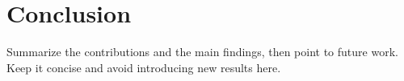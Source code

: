 \section{Conclusion}
\label{sec:conclusion}

Summarize the contributions and the main findings, then point to future
work. Keep it concise and avoid introducing new results here.
